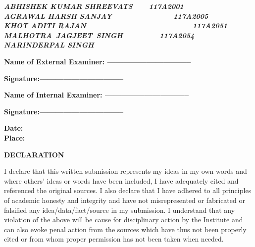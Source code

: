 \documentclass[12pt]{article}
\begin{document}
\vspace{\baselineskip}
\textbf{\textit{ABHISHEK KUMAR SHREEVATS\ \ \ \  117A2001}} \\
\textbf{\textit{AGRAWAL HARSH SANJAY\ \ \ \ \ \ \ \ \ \ \ \ \ \ \  117A2005}} \\
\textbf{\textit{KHOT ADITI RAJAN\ \ \ \ \ \ \ \ \ \ \ \ \ \ \ \ \ \ \ \ \ \ \ \ \ \  117A2051}} \\
\textbf{\textit{MALHOTRA\ JAGJEET\ SINGH\ \ \ \ \ \ \ \ \    117A2054}} \\
\textbf{\textit{NARINDERPAL SINGH\ \ \  }}

\vspace{\baselineskip}

\vspace{\baselineskip}
\begin{FlushRight}
\textbf{Name of External Examiner: --------------------------------}
\end{FlushRight}
\begin{FlushRight}
\textbf{Signature:--------------------------------}
\end{FlushRight}
\begin{FlushRight}
\textbf{Name of Internal Examiner: --------------------------------}
\end{FlushRight}
\begin{FlushRight}
\textbf{Signature:--------------------------------}
\end{FlushRight}
\textbf{Date:} \\
\textbf{Place:}

\vspace{\baselineskip}
\vspace{\baselineskip}
\vspace{\baselineskip}
\vspace{\baselineskip}
\vspace{\baselineskip}
\vspace{\baselineskip}
\vspace{\baselineskip}


\begin{Center}
\textbf{DECLARATION}
\end{Center}
\begin{justify}
I declare that this written submission represents my ideas in my own words and where others’ ideas or words have been included, I have adequately cited and referenced the original sources. I also declare that I have adhered to all principles of academic honesty and integrity and have not misrepresented or fabricated or falsified any idea/data/fact/source in my submission. I understand that any violation of the above will be cause for disciplinary action by the Institute and can also evoke penal action from the sources which have thus not been properly cited or from whom proper permission has not been taken when needed.
\end{justify}
\end{document}
